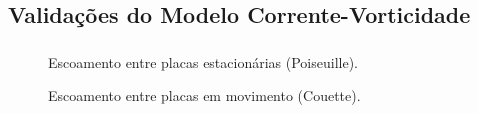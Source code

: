 \documentclass{beamer}
\begin{document}
\subsection*{Validações do Modelo Corrente-Vorticidade}
\begin{frame}
  \frametitle{\subsecname}
  
  \begin{minipage}{.60\textwidth}
    \begin{figure}
       {\raggedleft \tiny Escoamento entre placas estacionárias (Poiseuille).}
    \end{figure}
    \vspace*{-\baselineskip}\setlength\belowdisplayshortskip{0pt} %
    \begin{figure}
       {\raggedleft \tiny Escoamento entre placas em movimento (Couette).}
    \end{figure}
  \end{minipage}
  \hfill
  \begin{minipage}{.36\textwidth}
    \begin{figure}
      \stackunder{
}
\end{figure}
\end{minipage}
\end{frame}
\end{document}
